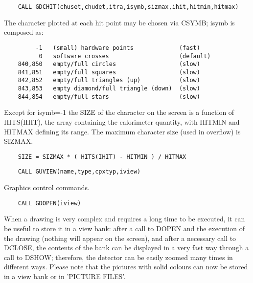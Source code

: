 \begin{verbatim}
    CALL GDCHIT(chuset,chudet,itra,isymb,sizmax,ihit,hitmin,hitmax)
\end{verbatim}
   \par
The character plotted at each hit point may be chosen via CSYMB; isymb is 
   composed as:  
\begin{verbatim}
         -1   (small) hardware points             (fast)
          0   software crosses                    (default)
    840,850   empty/full circles                  (slow)
    841,851   empty/full squares                  (slow)
    842,852   empty/full triangles (up)           (slow)
    843,853   empty diamond/full triangle (down)  (slow)
    844,854   empty/full stars                    (slow)
\end{verbatim}
   \par
Except for isymb=-1 the SIZE of the character on the screen is a function 
   of HITS(IHIT), the array containing the calorimeter quantity, with HITMIN 
   and HITMAX defining its range.  The maximum character size (used in 
   overflow) is SIZMAX.  
\begin{verbatim}
    SIZE = SIZMAX * ( HITS(IHIT) - HITMIN ) / HITMAX
\end{verbatim}

\ENDCMD


\BEGARG
{}
\ENDARG

\begin{verbatim}
    CALL GUVIEW(name,type,cpxtyp,iview)
\end{verbatim}

\ENDCMD
\newpage
{}
\ifMENUtext
   \par
Graphics control commands.  


\fi


\BEGARG
{}
\ENDARG

\begin{verbatim}
    CALL GDOPEN(iview)
\end{verbatim}
   \par
When a drawing is very complex and requires a long time to be executed, it 
   can be useful to store it in a view bank: after a call to DOPEN and the 
   execution of the drawing (nothing will appear on the screen), and after a 
   necessary call to DCLOSE, the contents of the bank can be displayed in a 
   very fast way through a call to DSHOW; therefore, the detector can be 
   easily zoomed many times in different ways. Please note that the pictures 
   with solid colours can now be stored in a view bank or in 'PICTURE FILES'.  

